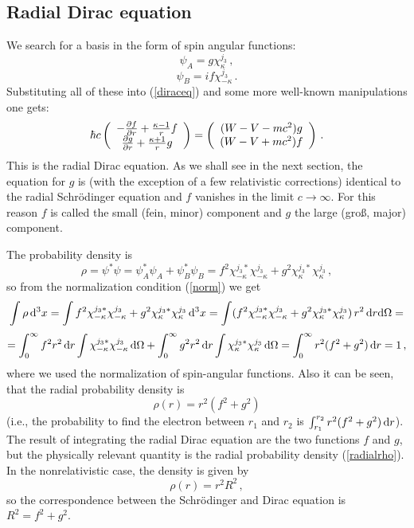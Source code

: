 \subsection{Radial Dirac equation}

We search for a basis in the form of spin angular functions: 
\begin{equation}
  \psi_A=g\chi^{j_3}_{\kappa}\,,  \label{psia}
\end{equation}
\begin{equation}
  \psi_B=if\chi^{j_3}_{-\kappa}\,.  \label{psib}
\end{equation}
Substituting all of these into (\ref{diraceq}) and some more well-known manipulations one gets: 
\begin{equation}
  \hbar c \left(\begin{array}{c} -{\partial f\over\partial r}+{\kappa-1\over r}f\\ {\partial g\over\partial r}+{\kappa+1\over r}g\\ \end{array}\right)= \left(\begin{array}{c} (W-V-mc^2)g\\ (W-V+mc^2)f\\ \end{array}\right)\,.  \label{radialdirac}
\end{equation}
This is the radial Dirac equation. As we shall see in the next section, the equation for $g$ is (with the exception of a few relativistic corrections) identical to the radial Schrödinger equation and $f$ vanishes in the limit $c\to\infty$. For this reason $f$ is called the small (fein, minor) component and $g$ the large (groß, major) component.

The probability density is 
\begin{equation*}
  \rho=\psi^*\psi=\psi^*_A\psi_A+\psi^*_B\psi_B= f^2\chi^{j_3*}_{-\kappa}\chi^{j_3}_{-\kappa}+ g^2\chi^{j_3*}_{\kappa}\chi^{j_3}_{\kappa}\,,
\end{equation*}
so from the normalization condition (\ref{norm}) we get 
\begin{equation*}
  \int \rho \,{\rm d}^3x= \int f^2\chi^{j_3*}_{-\kappa}\chi^{j_3}_{-\kappa}+ g^2\chi^{j_3*}_{\kappa}\chi^{j_3}_{\kappa} \,{\rm d}^3x= \int (f^2\chi^{j_3*}_{-\kappa}\chi^{j_3}_{-\kappa}+ g^2\chi^{j_3*}_{\kappa}\chi^{j_3}_{\kappa})\,r^2\,{\rm d} r{\rm d}\Omega=
\end{equation*}
\begin{equation*}
  =\int_0^\infty f^2r^2\,{\rm d} r\int\chi^{j_3*}_{-\kappa}\chi^{j_3}_{-\kappa} \,{\rm d}\Omega+ \int_0^\infty g^2r^2\,{\rm d} r\int\chi^{j_3*}_{\kappa}\chi^{j_3}_{\kappa} \,{\rm d}\Omega= \int_0^\infty r^2(f^2+g^2)\,{\rm d} r=1\,,
\end{equation*}
where we used the normalization of spin-angular functions. Also it can be seen, that the radial probability density is 
\begin{equation}
  \rho(r)=r^2(f^2+g^2)  \label{radialrho}
\end{equation}
(i.e., the probability to find the electron between $r_1$ and $r_2$ is $\int_{r_1}^{r_2}r^2(f^2+g^2)\,{\rm d} r$). The result of integrating the radial Dirac equation are the two functions $f$ and $g$, but the physically relevant quantity is the radial probability density (\ref{radialrho}). In the nonrelativistic case, the density is given by 
\begin{equation*}
  \rho(r)=r^2R^2\,,
\end{equation*}
so the correspondence between the Schrödinger and Dirac equation is $R^2=f^2+g^2$.

